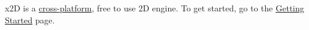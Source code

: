 x2\-D is a \hyperlink{platforms}{cross-\/platform}, free to use 2\-D engine. To get started, go to the \hyperlink{get_started}{Getting Started} page. 